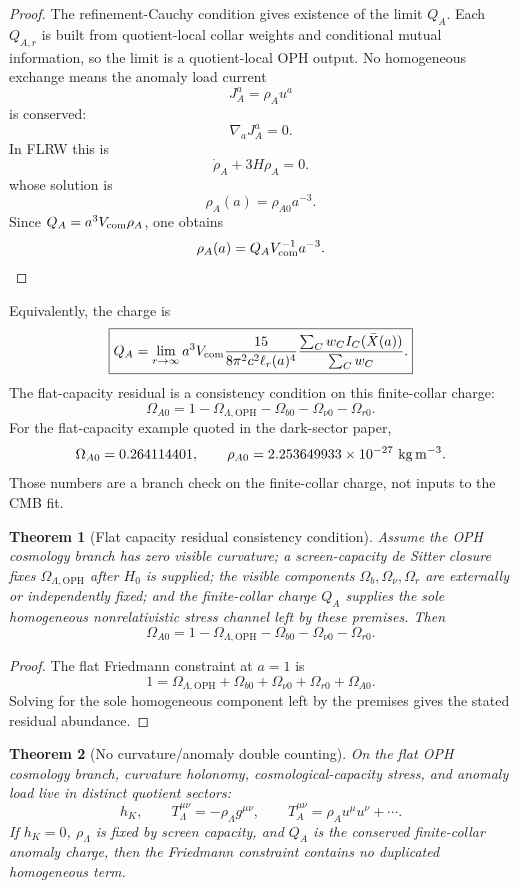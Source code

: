 \documentclass[11pt]{article}
\newtheorem{theorem}{Theorem}[section]
\newcommand{\OPH}{\mathrm{OPH}}
\begin{document}
\begin{proof}
The refinement-Cauchy condition gives existence of the limit \(Q_A\). Each \(Q_{A,r}\) is built
from quotient-local collar weights and conditional mutual information, so the limit is a
quotient-local OPH output. No homogeneous exchange means the anomaly load current
\[
J_A^a=\rho_Au^a
\]
is conserved:
\[
\nabla_aJ_A^a=0.
\]
In FLRW this is
\[
\dot\rho_A+3H\rho_A=0.
\]
whose solution is
\[
\rho_A(a)=\rho_{A0}a^{-3}.
\]
Since \(Q_A=a^3V_{\rm com}\rho_A\), one obtains
\[
\rho_A(a)=Q_AV_{\rm com}^{-1}a^{-3}.
\]
\end{proof}

Equivalently, the charge is
\[
\boxed{
Q_A
=
\lim_{r\to\infty}
a^3V_{\rm com}
\frac{15}{8\pi^2c^2\ell_r(a)^4}
\frac{\sum_Cw_CI_C(\bar X(a))}{\sum_Cw_C}.
}
\]
The flat-capacity residual is a consistency condition on this finite-collar charge:
\[
\Omega_{A0}
=
1-\Omega_{\Lambda,\OPH}
-\Omega_{b0}-\Omega_{\nu0}-\Omega_{r0}.
\]
For the flat-capacity example quoted in the dark-sector paper,
\[
\Omega_{A0}=0.264114401,
\qquad
\rho_{A0}=2.253649933\times10^{-27}\ {\rm kg\,m^{-3}}.
\]
Those numbers are a branch check on the finite-collar charge, not inputs to the CMB fit.

\begin{theorem}[Flat capacity residual consistency condition]\label{thm:anomaly-residual}
Assume the OPH cosmology branch has zero visible curvature; a screen-capacity de Sitter closure
fixes \(\Omega_{\Lambda,\OPH}\) after \(H_0\) is supplied; the visible components
\(\Omega_b,\Omega_\nu,\Omega_r\) are externally or independently fixed; and the finite-collar
charge \(Q_A\) supplies the sole homogeneous nonrelativistic stress channel left by these premises.
Then
\[
\Omega_{A0}
=
1-\Omega_{\Lambda,\OPH}
-\Omega_{b0}-\Omega_{\nu0}-\Omega_{r0}.
\]
\end{theorem}

\begin{proof}
The flat Friedmann constraint at \(a=1\) is
\[
1=
\Omega_{\Lambda,\OPH}
+\Omega_{b0}
+\Omega_{\nu0}
+\Omega_{r0}
+\Omega_{A0}.
\]
Solving for the sole homogeneous component left by the premises gives the stated residual abundance.
\end{proof}

\begin{theorem}[No curvature/anomaly double counting]\label{thm:no-double-counting}
On the flat OPH cosmology branch, curvature holonomy, cosmological-capacity stress, and anomaly
load live in distinct quotient sectors:
\[
h_K,
\qquad
T_\Lambda^{\mu\nu}=-\rho_\Lambda g^{\mu\nu},
\qquad
T_A^{\mu\nu}=\rho_Au^\mu u^\nu+\cdots .
\]
If \(h_K=0\), \(\rho_\Lambda\) is fixed by screen capacity, and \(Q_A\) is the conserved
finite-collar anomaly charge, then the Friedmann constraint contains no duplicated homogeneous
term.
\end{theorem}
\end{document}
